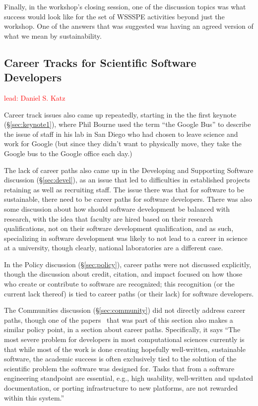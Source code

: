 \documentclass[11pt, oneside]{amsart}
\newcommand{\note}[1]{ {\textcolor{red}    { #1 }}}
\begin{document}
Finally, in the workshop's closing session, one of the discussion topics was
what success would look like for the set of WSSSPE activities beyond just the workshop.
One of the answers that was suggested was
having an agreed version of what we mean by sustainability.

\subsection{Career Tracks for Scientific Software Developers} \note{lead: Daniel S. Katz} \label{sec:career-tracks}

Career track issues also came up repeatedly, starting in the the first keynote (\S\ref{sec:keynote1}), where Phil Bourne used the term ``the Google Bus'' to describe the issue of staff in his lab in San Diego who had chosen to leave science and work for Google (but since they didn't want to physically move, they take the Google bus to the Google office each day.)

The lack of career paths also came up in the Developing and Supporting Software discussion (\S\ref{sec:devel}), as an issue that led to difficulties in established projects retaining as well as recruiting staff. The issue there was that for software to be sustainable, there need to be career paths for software developers.  There was also some discussion about how should software development be balanced with research, with the idea that faculty are hired based on their research qualifications, not on their software development qualification, and as such, specializing in software development was likely to not lead to a career in science at a university, though clearly, national laboratories are a different case.

In the Policy discussion (\S\ref{sec:policy}), career paths were not discussed explicitly, though the discussion about credit, citation, and impact focused on how those who create or contribute to software are recognized; this recognition (or the current lack thereof) is tied to career paths (or their lack) for software developers.

The Communities discussion (\S\ref{sec:community}) did not directly address career paths, though one of the papers~\cite{Loffler_WSSSPE} that was part of this section also makes a similar policy point, in a section about career paths. Specifically, it says ``The most severe problem for developers in most computational sciences currently is that while most of the work is done creating hopefully well-written, sustainable software, the academic success is often exclusively tied to the solution of the scientific problem the software was designed for. Tasks that from a software engineering standpoint are essential, e.g., high usability, well-written and updated documentation, or porting infrastructure to new platforms, are not rewarded within this system.''
\end{document}
